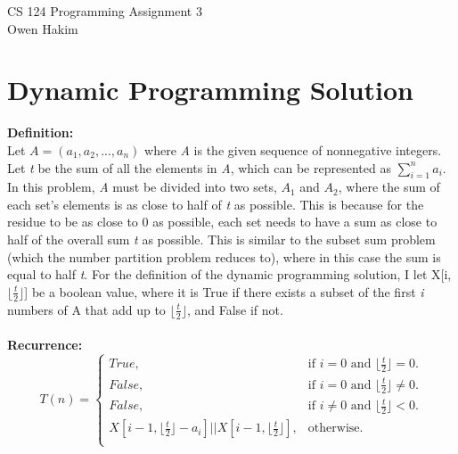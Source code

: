 \documentclass[11pt]{article}
\newcommand\floor[1]{\lfloor#1\rfloor}
\begin{document}
CS 124 Programming Assignment 3 \\
\indent Owen Hakim
\\

\section{\textbf{Dynamic Programming Solution}}
\textbf{Definition:}\\
Let $\textit{A} = (a_1, a_2, ..., a_n)$ where \textit{A} is the given sequence of nonnegative integers. Let \textit{t} be the sum of all
the elements in \textit{A}, which can be represented as  $ \sum_{i=1}^{n} a_{i} $. In this problem, \textit{A} must be divided into two sets, $\textit{A}_1$ and $\textit{A}_2$, where the sum of each set’s elements is as close to half of \textit{t} as possible. This is because for the residue to be as close to 0 as possible, each set needs to have a sum as close to half of the overall sum \textit{t} as possible. This is similar to the subset sum problem (which the number partition problem reduces to), where in this case the sum is equal to half \textit{t}. For the definition of the dynamic programming solution, I let X[i, $\floor{\frac{\textit{t}}{2}}$] be a boolean value, where it is True if there exists a subset of the first \textit{i} numbers of A that add up to $ \floor{\frac{\textit{t}}{2}} $, and False if not. \\\\

\textbf{Recurrence:}\\
\begin{equation}
	T(n) = \begin{cases}
		True, & \text{if $i = 0$ and $\floor{\frac{\textit{t}}{2}} = 0$}. \\
		False, &\text{if $i = 0$ and $\floor{\frac{\textit{t}}{2}} \neq 0$}. \\
		False, &\text{if $i \neq 0$ and $\floor{\frac{\textit{t}}{2}} < 0$}. \\
		X[i - 1, \floor{\frac{\textit{t}}{2}} - a_i] || X[i - 1, \floor{\frac{\textit{t}}{2}}], & \text{otherwise}. \\
	\end{cases}
\end{equation}
\end{document}
